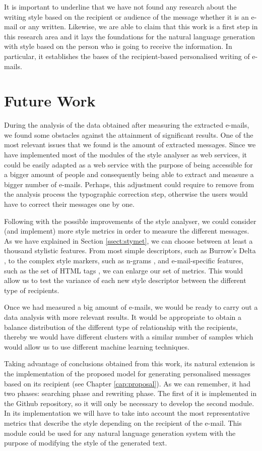 It is important to underline that we have not found any research about the writing style based on the recipient or audience of the message whether it is an e-mail or any written. Likewise, we are able to claim that this work is a first step in this research area and it lays the foundations for the natural language generation with style based on the person who is going to receive the information. In particular, it establishes the bases of the recipient-based personalised writing of e-mails.

\section{Future Work}\label{sect:future}
During the analysis of the data obtained after measuring the extracted e-mails, we found some obstacles against the attainment of significant results. One of the most relevant issues that we found is the amount of extracted messages. Since we have implemented most of the modules of the style analyser as web services, it could be easily adapted as a web service with the purpose of being accessible for a bigger amount of people and consequently being able to extract and measure a bigger number of e-mails. Perhaps, this adjustment could require to remove from the analysis process the typographic correction step, otherwise the users would have to correct their messages one by one.

Following with the possible improvements of the style analyser, we could consider (and implement) more style metrics in order to measure the different messages. As we have explained in Section \ref{ssect:stymet}, we can choose between at least a thousand stylistic features. From most simple descriptors, such as Burrow's Delta \citep{burrows2002delta}, to the complex style markers, such as n-grams \citep{brocardo2013authorship}, and e-mail-specific features, such as the set of HTML tags \citep{de2001mining}, we can enlarge our set of metrics. This would allow us to test the variance of each new style descriptor between the different type of recipients.

Once we had measured a big amount of e-mails, we would be ready to carry out a data analysis with more relevant results. It would be appropriate to obtain a balance distribution of the different type of relationship with the recipients, thereby we would have different clusters with a similar number of samples which would allow us to use different machine learning techniques.

Taking advantage of conclusions obtained from this work, its natural extension is the implementation of the proposed model for generating personalised messages based on its recipient (see Chapter \ref{cap:proposal}). As we can remember, it had two phases: searching phase and rewriting phase. The first of it is implemented in the Github repository, so it will only be necessary to develop the second module. In its implementation we will have to take into account the most representative metrics that describe the style depending on the recipient of the e-mail. This module could be used for any natural language generation system with the purpose of modifying the style of the generated text.